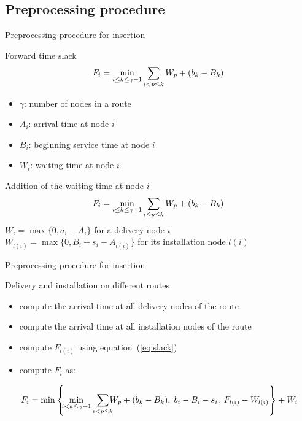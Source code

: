 \documentclass[9pt,xcolor={dvipsnames}]{beamer}
\begin{document}
\subsection{Preprocessing procedure}
\begin{frame}{Preprocessing procedure for insertion}
	\begin{block}{Forward time slack \citep{cordeau2004improved}}
		\begin{equation}
			\label{eq:slack1}
	 		F_i= \min_{i \leq k \leq \gamma+1}{ \sum_{i < p \leq k}{ W_{p} + (b_k-B_k)}\hspace{0.1cm}} 
	 	\end{equation}
	 	\begin{itemize}
	 		\item  $\gamma$: number of nodes in a route 
	 		\item $A_i$: arrival time at node $i$
	 		\item $B_i$: beginning service time at node $i$
	 		\item $W_{i}$: waiting time at node $i$
	 	\end{itemize}
	\end{block}		
	
	\begin{block}{Addition of the waiting time at node $i$}
		\begin{equation}
		\label{eq:slack}
	 F_i= \min_{i \leq k \leq \gamma+1}{ \sum_{i \leq p \leq k}{ W_{p} + (b_k-B_k)} \hspace{0.1cm} }
	 \end{equation}
	 $W_{i}= \max{\lbrace 0, a_{i} - A_{i} \rbrace} $ for a delivery node $i$ \\
	  $W_{l(i)}= \max{\lbrace 0, B_{i} + s_i - A_{l(i)} \rbrace} $ for its installation node $l(i)$
	 \end{block}	
\end{frame}

\begin{frame}{Preprocessing procedure for insertion}
\begin{block}{Delivery and installation on different routes}
		\begin{itemize}[]
	 		\item compute the arrival time at all delivery nodes of the route
			\item compute the arrival time at all installation nodes of the route
			\item compute $F_{l(i)}$ using equation~(\ref{eq:slack})
	 		\item compute $F_{i}$ as:
	  	\end{itemize}
	\begin{align*}		
	 \hspace{0mm} F_{i} = \min \left\lbrace  \hspace{-1mm} \min_{i < k \leq \gamma+1}{ \sum_{i < p \leq k}{ \hspace{-2mm}W_{p} + (b_k-B_k )}}, \hspace{1mm} b_i-B_i - s_i,\hspace{1mm} F_{l(i)}-W_{l(i)} \right\rbrace  + W_i  
	 \end{align*}
\end{block}
\end{frame}
\end{document}
